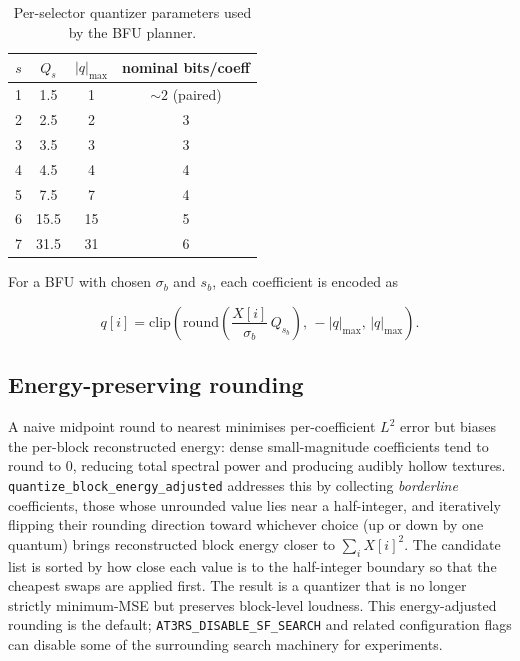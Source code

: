 \documentclass[11pt]{article}
\begin{document}
\begin{table}[ht]
\centering\small
\begin{tabular}{cccc}
\toprule
\(s\) & \(Q_s\) & \(|q|_{\max}\) & nominal bits/coeff \\
\midrule
1 & 1.5  &  1 & \(\sim\!2\) (paired) \\
2 & 2.5  &  2 & 3 \\
3 & 3.5  &  3 & 3 \\
4 & 4.5  &  4 & 4 \\
5 & 7.5  &  7 & 4 \\
6 & 15.5 & 15 & 5 \\
7 & 31.5 & 31 & 6 \\
\bottomrule
\end{tabular}
\caption{Per-selector quantizer parameters used by the BFU planner.}
\label{tab:selectors}
\end{table}

For a BFU with chosen \(\sigma_b\) and \(s_b\), each coefficient is encoded
as

\begin{equation}
    q[i] = \mathrm{clip}\!\left(\mathrm{round}\!\left(\frac{X[i]}{\sigma_b}\,Q_{s_b}\right),\,-|q|_{\max},\,|q|_{\max}\right).
    \label{eq:quant}
\end{equation}

\subsection{Energy-preserving rounding}

A naive midpoint round to nearest minimises per-coefficient \(L^2\) error
but biases the per-block reconstructed energy: dense small-magnitude
coefficients tend to round to \(0\), reducing total spectral power and
producing audibly hollow textures. \texttt{quantize\_block\_energy\_adjusted}
addresses this by collecting \emph{borderline} coefficients, those whose
unrounded value lies near a half-integer, and iteratively flipping their
rounding direction toward whichever choice (up or down by one quantum) brings
reconstructed block energy closer to \(\sum_i X[i]^2\). The candidate list is
sorted by how close each value is to the half-integer boundary so that the
cheapest swaps are applied first. The result is a quantizer that is no longer
strictly minimum-MSE but preserves block-level loudness. This energy-adjusted
rounding is the default; \texttt{AT3RS\_DISABLE\_SF\_SEARCH} and related
configuration flags can disable some of the surrounding search machinery for
experiments.
\end{document}
